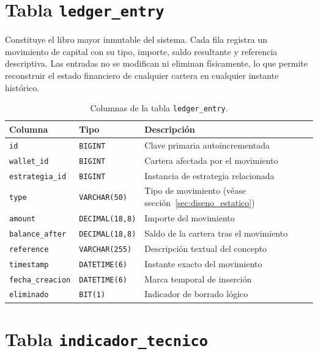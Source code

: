 \section*{Tabla \texttt{ledger\_entry}}

Constituye el libro mayor inmutable del sistema. Cada fila registra un movimiento de capital con su tipo, importe, saldo resultante y referencia descriptiva. Las entradas no se modifican ni eliminan físicamente, lo que permite reconstruir el estado financiero de cualquier cartera en cualquier instante histórico.

\begin{table}[h]
\centering
\caption{Columnas de la tabla \texttt{ledger\_entry}.}
\label{tab:sql-ledger}
\begin{tabular}{@{}llp{6.2cm}@{}}
\toprule
\textbf{Columna} & \textbf{Tipo} & \textbf{Descripción} \\
\midrule
\texttt{id}             & \texttt{BIGINT}        & Clave primaria autoincrementada \\
\texttt{wallet\_id}     & \texttt{BIGINT}        & Cartera afectada por el movimiento \\
\texttt{estrategia\_id} & \texttt{BIGINT}        & Instancia de estrategia relacionada \\
\texttt{type}           & \texttt{VARCHAR(50)}   & Tipo de movimiento (véase sección~\ref{sec:diseno_estatico}) \\
\texttt{amount}         & \texttt{DECIMAL(18,8)} & Importe del movimiento \\
\texttt{balance\_after} & \texttt{DECIMAL(18,8)} & Saldo de la cartera tras el movimiento \\
\texttt{reference}      & \texttt{VARCHAR(255)}  & Descripción textual del concepto \\
\texttt{timestamp}      & \texttt{DATETIME(6)}   & Instante exacto del movimiento \\
\texttt{fecha\_creacion}& \texttt{DATETIME(6)}   & Marca temporal de inserción \\
\texttt{eliminado}      & \texttt{BIT(1)}        & Indicador de borrado lógico \\
\bottomrule
\end{tabular}
\end{table}

\section*{Tabla \texttt{indicador\_tecnico}}

